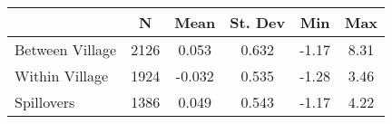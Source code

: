 \begin{tabular}{l*{5}{c}}\hline&\multicolumn{1}{c}{N}&\multicolumn{1}{c}{Mean}&\multicolumn{1}{c}{St. Dev}&\multicolumn{1}{c}{Min}&\multicolumn{1}{c}{Max}\\ \hline 
Between Village & 2126 & 0.053 & 0.632 & -1.17 & 8.31 \\
Within Village & 1924 & -0.032 & 0.535 & -1.28 & 3.46 \\
Spillovers & 1386 & 0.049 & 0.543 & -1.17 & 4.22 \\
\hline \end{tabular}
